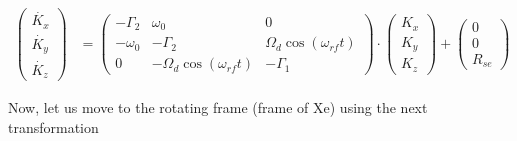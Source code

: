 \documentclass{article}
\begin{document}
\begin{align}
    \left(\begin{matrix}
    \dot{K_x}\\
    \dot{K_y}\\
    \dot{K_z}
    \end{matrix}\right)
    &=  
    \left(\begin{matrix}
    -\Gamma_2               &  \omega_0                        &  0                              \\
    -\omega_0               &  -\Gamma_2                       &  \Omega_d \cos{(\omega_{rf} t)} \\
    0                       &  -\Omega_d \cos{(\omega_{rf} t)} &  -\Gamma_1 
    \end{matrix}\right)\cdot
    \left(\begin{matrix}
    K_x\\
    K_y\\
    K_z
    \end{matrix}\right) + 
    \left(\begin{matrix}
         0  \\
         0  \\
         R_{se} 
    \end{matrix}\right)
\end{align}


Now, let us move to the rotating frame (frame of Xe) using the next transformation
\end{document}
